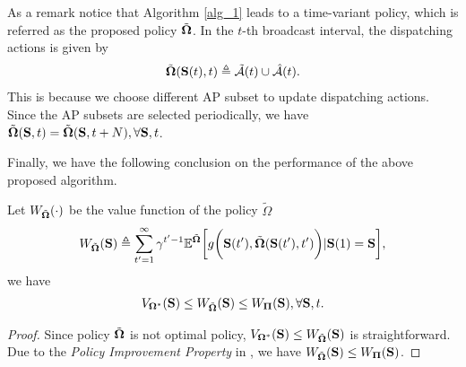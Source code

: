 As a remark notice that Algorithm \ref{alg_1} leads to a time-variant policy, which is referred as the proposed policy $\tilde{\boldsymbol{\Omega}}$.
In the $t$-th broadcast interval, the dispatching actions is given by
\begin{align}
    \tilde{\boldsymbol{\Omega}}(\mathbf{S}(t), t) \triangleq \tilde{\mathcal{A}}(t) \cup \hat{\mathcal{A}}(t).
\end{align}
This is because we choose different AP subset to update dispatching actions.
Since the AP subsets are selected periodically, we have $\tilde{\boldsymbol{\Omega}}(\mathbf{S}, t) = \tilde{\boldsymbol{\Omega}}(\mathbf{S}, t+N), \forall \mathbf{S},t$.

Finally, we have the following conclusion on the performance of the above proposed algorithm.
\begin{lemma}
    \label{lemma:perform}
    Let $W_{\tilde{\boldsymbol{\Omega}}}(\cdot)$ be the value function of the policy $\tilde{\Omega}$
    \begin{align}
        W_{\tilde{\boldsymbol{\Omega}}}(\mathbf{S}) \triangleq
        \sum_{t'=1}^{\infty} \gamma^{t'-1} \mathbb{E}^{ \tilde{\boldsymbol{\Omega}} } \bigg[
            g\bigg(\mathbf{S}(t'), \tilde{\boldsymbol{\Omega}}(\mathbf{S}(t'),t')\bigg) | \mathbf{S}(1)=\mathbf{S}
        \bigg],
    \end{align}
    we have
    \begin{align}
        V_{\boldsymbol{\Omega}^*}(\mathbf{S})
        \leq W_{\tilde{\boldsymbol{\Omega}}}(\mathbf{S})
        \leq W_{\boldsymbol{\Pi}}(\mathbf{S}),
        \forall \mathbf{S},t.
    \end{align}
\end{lemma}
\begin{proof}
    Since policy $\tilde{\boldsymbol{\Omega}}$ is not optimal policy, $V_{\boldsymbol{\Omega}^*}(\mathbf{S}) \leq W_{\tilde{\boldsymbol{\Omega}}}(\mathbf{S})$ is straightforward.
    Due to the \emph{Policy Improvement Property} in \cite{dp-control}, we have $W_{\tilde{\boldsymbol{\Omega}}}(\mathbf{S}) \leq W_{\boldsymbol{\Pi}}(\mathbf{S})$.
\end{proof}

